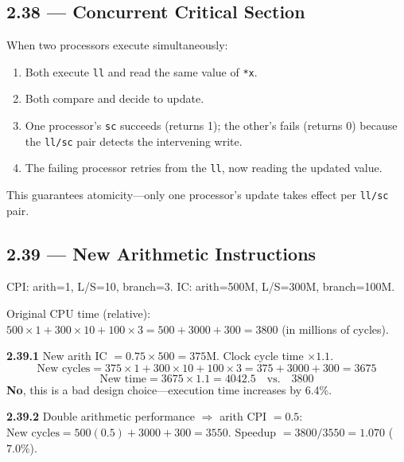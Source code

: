 \subsection*{2.38 --- Concurrent Critical Section}
\hypertarget{sol-2.38}{}

When two processors execute simultaneously:
\begin{enumerate}
  \item Both execute \texttt{ll} and read the same value of \texttt{*x}.
  \item Both compare and decide to update.
  \item One processor's \texttt{sc} succeeds (returns 1); the other's fails
        (returns 0) because the \texttt{ll/sc} pair detects the intervening
        write.
  \item The failing processor retries from the \texttt{ll}, now reading the
        updated value.
\end{enumerate}
This guarantees atomicity---only one processor's update takes effect per
\texttt{ll/sc} pair.

\subsection*{2.39 --- New Arithmetic Instructions}
\hypertarget{sol-2.39}{}

CPI: arith=1, L/S=10, branch=3.
IC: arith=500M, L/S=300M, branch=100M.

Original CPU time (relative):
$500 \times 1 + 300 \times 10 + 100 \times 3 = 500 + 3000 + 300 = 3800$
(in millions of cycles).

\noindent\textbf{2.39.1}
New arith IC $= 0.75 \times 500 = 375$M. Clock cycle time $\times 1.1$.
\[
  \text{New cycles} = 375 \times 1 + 300 \times 10 + 100 \times 3
  = 375 + 3000 + 300 = 3675
\]
\[
  \text{New time} = 3675 \times 1.1 = 4042.5
  \quad\text{vs.}\quad 3800
\]
\textbf{No}, this is a bad design choice---execution time increases by 6.4\%.

\medskip\noindent\textbf{2.39.2}
Double arithmetic performance $\Rightarrow$ arith CPI $= 0.5$:
$\text{New cycles} = 500(0.5) + 3000 + 300 = 3550$.
Speedup $= 3800/3550 = 1.070$ ($7.0\%$).

